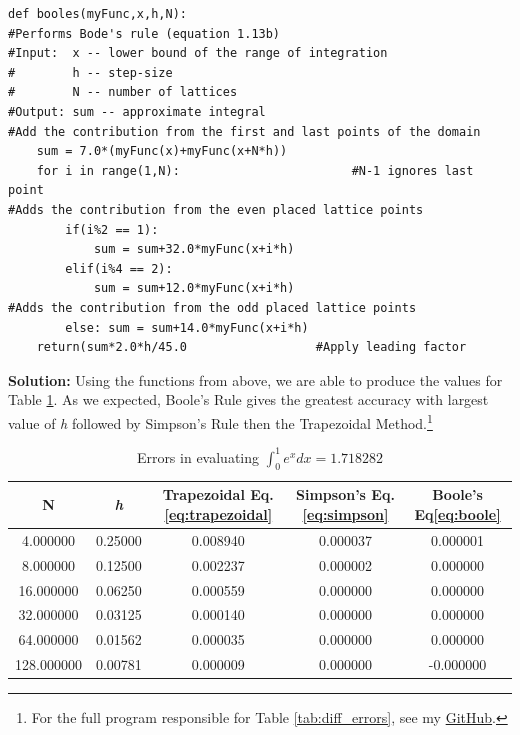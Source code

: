 \documentclass[10pt]{article}
\begin{document}
\begin{lstlisting}
def booles(myFunc,x,h,N):
#Performs Bode's rule (equation 1.13b)
#Input:  x -- lower bound of the range of integration
#        h -- step-size
#        N -- number of lattices
#Output: sum -- approximate integral 
#Add the contribution from the first and last points of the domain
    sum = 7.0*(myFunc(x)+myFunc(x+N*h))
    for i in range(1,N):                        #N-1 ignores last point
#Adds the contribution from the even placed lattice points        
        if(i%2 == 1):
            sum = sum+32.0*myFunc(x+i*h)
        elif(i%4 == 2):
            sum = sum+12.0*myFunc(x+i*h)
#Adds the contribution from the odd placed lattice points            
        else: sum = sum+14.0*myFunc(x+i*h)                    
    return(sum*2.0*h/45.0                  #Apply leading factor
\end{lstlisting}
\label{solution:1.2}\textbf{Solution:}
Using the functions from above, we are able to produce the values for Table \ref{tab:quad_errors}. As we expected, Boole's Rule gives the greatest accuracy with largest value of \textit{h} followed by Simpson's Rule then the Trapezoidal Method.\footnote{For the full program responsible for Table \ref{tab:diff_errors}, see my \href{https://github.com/jmelahman/computational-physics-solutions/blob/master/exercises_python/Chapter\%201/exercise1_2.py}{GitHub}.} 
\begin{table}[!ht]
	\begin{center}
	\caption{Errors in evaluating $\int^1_0 e^x dx = 1.718282$ }
		\label{tab:quad_errors}
		\begin{tabular}{|ccccc|}
		\hline
		N & \textit{h} & Trapezoidal Eq.\ref{eq:trapezoidal} & Simpson's Eq.\ref{eq:simpson} & Boole's Eq\ref{eq:boole} \\
		\hline
		4.000000&0.25000&0.008940&0.000037&0.000001\\ 
		8.000000&0.12500&0.002237&0.000002&0.000000\\ 
		16.000000&0.06250&0.000559&0.000000&0.000000\\ 
		32.000000&0.03125&0.000140&0.000000&0.000000\\ 
		64.000000&0.01562&0.000035&0.000000&0.000000\\ 
		128.000000&0.00781&0.000009&0.000000&-0.000000\\ 
		\hline
		\end{tabular}
	\end{center}
\end{table} 
\end{document}
